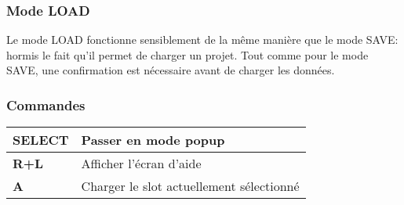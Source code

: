 \subsubsection{Mode LOAD}

Le mode LOAD fonctionne sensiblement de la même manière que le mode SAVE: hormis le fait qu'il permet de charger un projet.
Tout comme pour le mode SAVE, une confirmation est nécessaire avant de charger les données.


\subsubsection{Commandes}
\tablelasttail{\hline}
\begin{supertabular}{|l|p{11cm}|}
\hline
    {\bf SELECT} & Passer en mode popup \\
    \hline
    {\bf R+L} & Afficher l'écran d'aide \\
    \hline
    {\bf A} & Charger le slot actuellement sélectionné \\
\hline
\end{supertabular}


